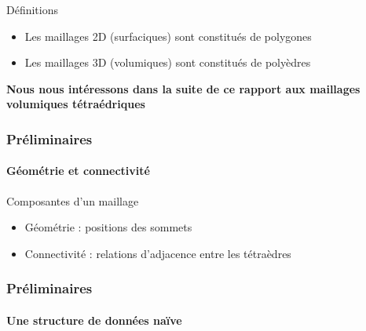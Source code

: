 \documentclass[9pt]{beamer}
\begin{document}
\begin{frame}
\begin{figure}[H]
\begin{subfigure}{.5\textwidth}
\end{subfigure}
\end{figure}
\begin{block}{Définitions}
\begin{itemize}
\item Les maillages 2D (surfaciques) sont constitués de polygones
\item Les maillages 3D (volumiques) sont constitués de polyèdres
\end{itemize}
\end{block}
\small
\textbf{Nous nous intéressons dans la suite de ce rapport aux maillages volumiques tétraédriques
}
\end{frame}

\begin{frame}
\frametitle{Préliminaires}
\framesubtitle{Géométrie et connectivité}
\begin{block}{Composantes d'un maillage}
\begin{itemize}
\item Géométrie : positions des sommets
\item Connectivité : relations d’adjacence entre les tétraèdres
\end{itemize}
\end{block}
\end{frame}

\begin{frame}
\frametitle{Préliminaires}
\framesubtitle{Une structure de données naïve}
\end{frame}
\end{document}
